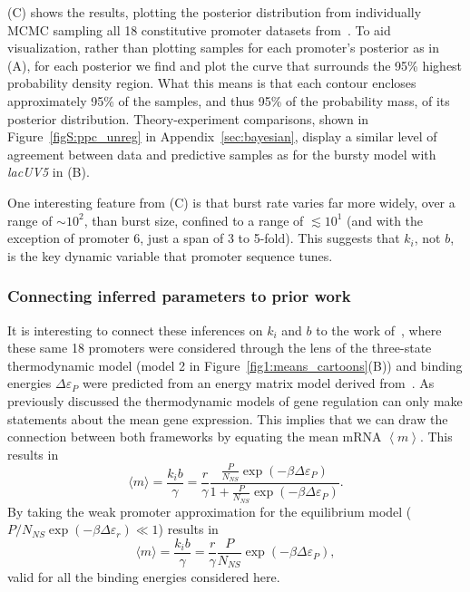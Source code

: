 (C) shows the results, plotting the posterior
distribution from individually MCMC sampling all 18 constitutive promoter
datasets from~\cite{Jones2014}. To aid visualization, rather than plotting
samples for each promoter's posterior as in (A), for
each posterior we find and plot the curve that surrounds the 95\% highest
probability density region. What this means is that each contour 
encloses approximately 95\% of the samples, and thus 95\% of the probability
mass, of its posterior distribution. Theory-experiment comparisons,
shown in Figure~\ref{figS:ppc_unreg} in Appendix~\ref{sec:bayesian},
display a similar level of agreement between data and predictive samples as for
the bursty model with \textit{lacUV5} in (B).

One interesting feature from (C) is that burst rate
varies far more widely, over a range of $\sim10^2$, than burst size, confined to
a range of $\lesssim10^1$ (and with the exception of promoter 6, just a span of
3 to 5-fold). This suggests that $k_i$, not $b$, is the key dynamic variable that
promoter sequence tunes.

\subsubsection{Connecting inferred parameters to prior work}
It is interesting to connect these inferences on $k_i$ and $b$ to the work
of~\cite{Brewster2012}, where these same 18 promoters were considered through
the lens of the three-state thermodynamic model (model 2 in
Figure~\ref{fig1:means_cartoons}(B)) and binding energies $\Delta\varepsilon_P$
were predicted from an energy matrix model derived from~\cite{Kinney2010}. As
previously discussed the thermodynamic models of gene regulation can only make
statements about the mean gene expression. This implies that we can draw the
connection between both frameworks by equating the mean mRNA $\left\langle m
\right\rangle$. This results in
\begin{equation}
\langle m \rangle = \frac{k_i b}{\gamma}
        = \frac{r}{\gamma}
        \frac{\frac{P}{N_{NS}}\exp(-\beta\Delta\varepsilon_P)}
                {1+\frac{P}{N_{NS}}\exp(-\beta\Delta\varepsilon_P)}.
\end{equation}
By taking the weak promoter approximation for the equilibrium model ($P/N_{NS} 
\exp(-\beta\Delta\varepsilon_r) \ll 1$) results in~\cite{Brewster2012}
\begin{equation}
\langle m \rangle = \frac{k_i b}{\gamma}
        = \frac{r}{\gamma} \frac{P}{N_{NS}}\exp(-\beta\Delta\varepsilon_P),
\end{equation}
valid for all the binding energies considered here.

